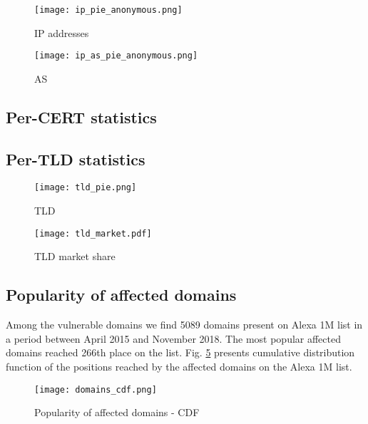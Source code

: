 \begin{figure}[!hbt]
\centering
\texttt{[image: ip\_pie\_anonymous.png]}
\caption{IP addresses}
\label{fig:ip_pie}
\end{figure}

\begin{figure}[!hbt]
\centering
\texttt{[image: ip\_as\_pie\_anonymous.png]}
\caption{AS}
\label{fig:ip_as_pie}
\end{figure}

\subsection{Per-CERT statistics}
\subsection{Per-TLD statistics}

\begin{figure}[!hbt]
\centering
\texttt{[image: tld\_pie.png]}
\caption{TLD}
\label{fig:tld_pie}
\end{figure}

\begin{figure}[!hbt]
\centering
\texttt{[image: tld\_market.pdf]}
\caption{TLD market share}
\label{fig:tld_market}
\end{figure}

\subsection{Popularity of affected domains}

Among the vulnerable domains we find 5089 domains present on Alexa 1M list in a period between April 2015 and November 2018. The most popular affected domains reached 266th place on the list. Fig. \ref{fig:domains_cdf} presents cumulative distribution function of the positions reached  by the affected domains on the Alexa 1M list. 


\begin{figure}[!hbt]
\centering
\texttt{[image: domains\_cdf.png]}
\caption{Popularity of affected domains - CDF}
\label{fig:domains_cdf}
\end{figure}
